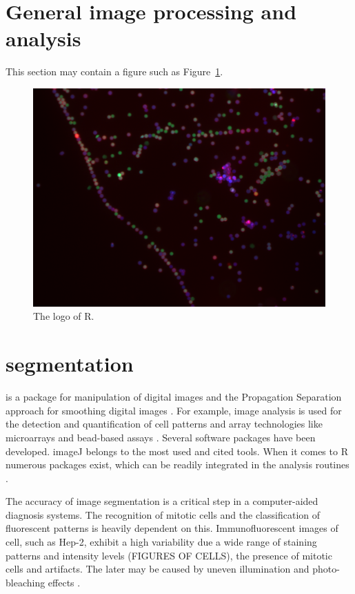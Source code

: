 \section{General image processing and analysis}

This section may contain a figure such as Figure~\ref{figure:bead}.

\begin{figure}[htbp]
  \centering
  \includegraphics[clip=true,trim=0.1cm 0.3cm 0.2cm 0.1cm, width=12cm]{bead}
  \caption{The logo of R.}
  \label{figure:bead}
\end{figure}

\section{segmentation}

\citep{holmes_interactive_2009}

 is a package for manipulation of digital images and the 
Propagation Separation approach for smoothing digital images \citep{polzehl_adaptive_2007}.
For example, image analysis is used for the detection and quantification of 
cell patterns and array technologies like microarrays and bead-based assays 
\citep{rodiger_highly_2013, willitzki_new_2012, willitzki_fully_2013, 
dunning_beadarray:_2006}.
Several software packages have been developed. imageJ belongs to the most 
used and cited tools. When it comes to R numerous packages exist, which can 
be readily integrated in the analysis routines \citep{frery_introduction_2013}.

The accuracy of image segmentation is a critical step in a computer-aided 
diagnosis systems. The recognition of mitotic cells and the classification of 
fluorescent patterns is heavily dependent on this. Immunofluorescent images 
of cell, such as Hep-2, exhibit a high variability due a wide range of staining 
patterns and intensity levels (FIGURES OF CELLS), the presence of mitotic 
cells and  artifacts. The later may be caused by uneven illumination and 
photo-bleaching effects \citep{tonti_automated_2015}.

